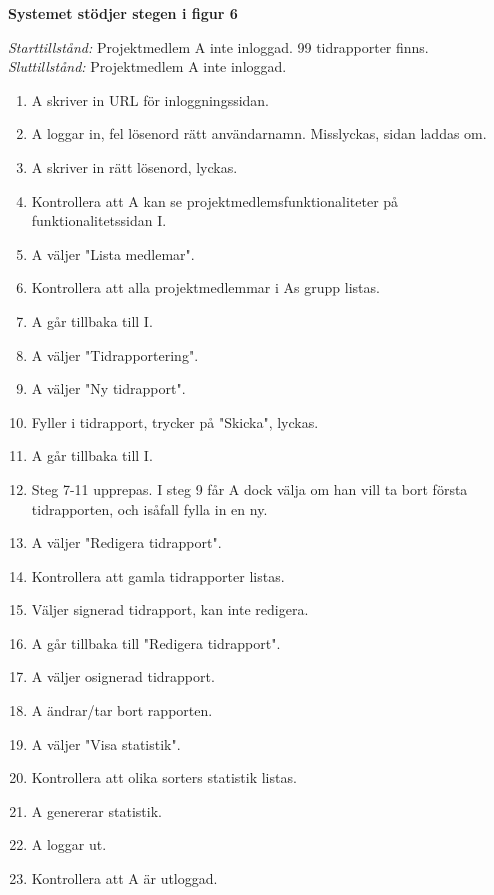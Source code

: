 \documentclass[a4paper]{article}
\begin{document}
\begin{ST}
\item
\textbf{Systemet stödjer stegen i figur 6}

\emph{Starttillstånd:} Projektmedlem A inte inloggad. 99 tidrapporter finns.\\
\emph{Sluttillstånd:} Projektmedlem A inte inloggad.\\

\begin{enumerate}

\item A skriver in URL för inloggningssidan.
\item A loggar in, fel lösenord rätt användarnamn. Misslyckas, sidan laddas om.
\item A skriver in rätt lösenord, lyckas.
\item Kontrollera att A kan se projektmedlemsfunktionaliteter på funktionalitetssidan I.
\item A väljer "Lista medlemar".
\item Kontrollera att alla projektmedlemmar i As grupp listas.
\item A går tillbaka till I.
\item A väljer "Tidrapportering".
\item A väljer "Ny tidrapport".
\item Fyller i tidrapport, trycker på "Skicka", lyckas.
\item A går tillbaka till I.
\item Steg 7-11 upprepas. I steg 9 får A dock välja om han vill ta bort första tidrapporten, och isåfall fylla in en ny.
\item A väljer "Redigera tidrapport".
\item Kontrollera att gamla tidrapporter listas.
\item Väljer signerad tidrapport, kan inte redigera.
\item A går tillbaka till "Redigera tidrapport".
\item A väljer osignerad tidrapport.
\item A ändrar/tar bort rapporten.
\item A väljer "Visa statistik".
\item Kontrollera att olika sorters statistik listas.
\item A genererar statistik.
\item A loggar ut.
\item Kontrollera att A är utloggad.

\end {enumerate}



\end{ST}
\end{document}
